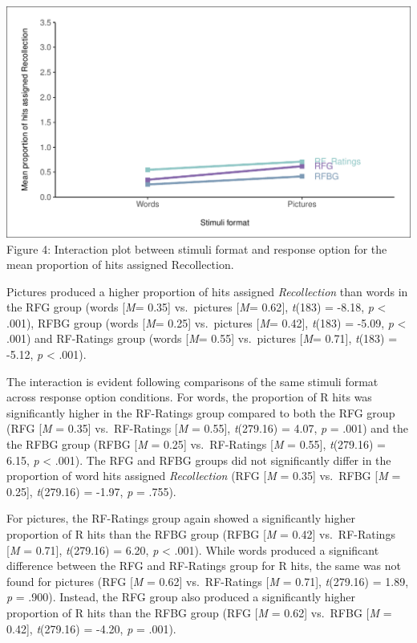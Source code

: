 \documentclass[
  11pt,
]{article}
\begin{document}
\includegraphics{R--Thesis_files/figure-latex/unnamed-chunk-11-1.pdf}
Figure 4: Interaction plot between stimuli format and response option
for the mean proportion of hits assigned Recollection.

Pictures produced a higher proportion of hits assigned
\emph{Recollection} than words in the RFG group (words {[}\emph{M}=
0.35{]} vs.~pictures {[}\emph{M}= 0.62{]}, \emph{t}(183) = -8.18,
\emph{p} \textless{} .001), RFBG group (words {[}\emph{M}= 0.25{]}
vs.~pictures {[}\emph{M}= 0.42{]}, \emph{t}(183) = -5.09, \emph{p}
\textless{} .001) and RF-Ratings group (words {[}\emph{M}= 0.55{]}
vs.~pictures {[}\emph{M}= 0.71{]}, \emph{t}(183) = -5.12, \emph{p}
\textless{} .001).

The interaction is evident following comparisons of the same stimuli
format across response option conditions. For words, the proportion of R
hits was significantly higher in the RF-Ratings group compared to both
the RFG group (RFG {[}\emph{M} = 0.35{]} vs.~RF-Ratings {[}\emph{M} =
0.55{]}, \emph{t}(279.16) = 4.07, \emph{p} = .001) and the the RFBG
group (RFBG {[}\emph{M} = 0.25{]} vs.~RF-Ratings {[}\emph{M} = 0.55{]},
\emph{t}(279.16) = 6.15, \emph{p} \textless{} .001). The RFG and RFBG
groups did not significantly differ in the proportion of word hits
assigned \emph{Recollection} (RFG {[}\emph{M} = 0.35{]} vs.~RFBG
{[}\emph{M} = 0.25{]}, \emph{t}(279.16) = -1.97, \emph{p} = .755).

For pictures, the RF-Ratings group again showed a significantly higher
proportion of R hits than the RFBG group (RFBG {[}\emph{M} = 0.42{]}
vs.~RF-Ratings {[}\emph{M} = 0.71{]}, \emph{t}(279.16) = 6.20, \emph{p}
\textless{} .001). While words produced a significant difference between
the RFG and RF-Ratings group for R hits, the same was not found for
pictures (RFG {[}\emph{M} = 0.62{]} vs.~RF-Ratings {[}\emph{M} =
0.71{]}, \emph{t}(279.16) = 1.89, \emph{p} = .900). Instead, the RFG
group also produced a significantly higher proportion of R hits than the
RFBG group (RFG {[}\emph{M} = 0.62{]} vs.~RFBG {[}\emph{M} = 0.42{]},
\emph{t}(279.16) = -4.20, \emph{p} = .001).
\end{document}
